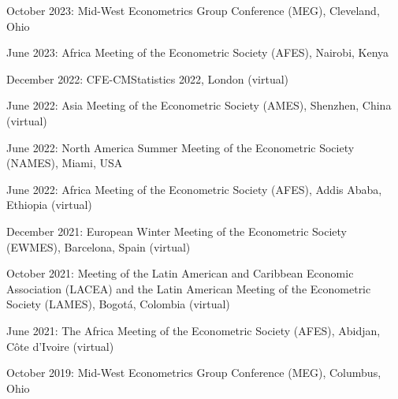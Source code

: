 \documentclass[12pt,letterpaper]{article}
\renewenvironment{itemize}{
  \begin{list}{}{
    \setlength{\leftmargin}{1.5em}
  }
}{
  \end{list}
}
\begin{document}
\begin{itemize}
  \item October 2023: Mid-West Econometrics Group Conference (MEG), Cleveland, Ohio
  \item June 2023: Africa Meeting of the Econometric Society (AFES), Nairobi, Kenya
  \item December 2022: CFE-CMStatistics 2022, London (virtual)
  \item June 2022: Asia Meeting of the Econometric Society (AMES), Shenzhen, China (virtual)
  \item June 2022: North America Summer Meeting of the Econometric Society (NAMES), Miami, USA
  \item June 2022: Africa Meeting of the Econometric Society (AFES), Addis Ababa, Ethiopia (virtual)
  \item December 2021: European Winter Meeting of the Econometric Society (EWMES), Barcelona, Spain (virtual)
  \item October 2021: Meeting of the Latin American and Caribbean Economic Association (LACEA) and the Latin American Meeting of the Econometric Society (LAMES), Bogotá, Colombia (virtual)
	\item June 2021: The Africa Meeting of the Econometric Society (AFES), Abidjan, C\^ote d'Ivoire (virtual)
	\item October 2019: Mid-West Econometrics Group Conference (MEG), Columbus, Ohio
\end{itemize}
\end{document}
